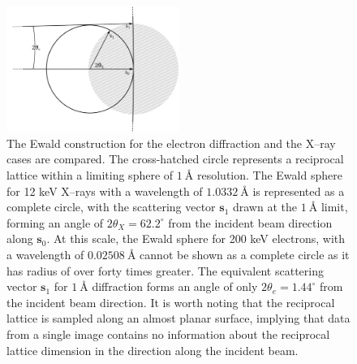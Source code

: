 \documentclass[preprint]{iucr}
\renewcommand{\vec}[1]{\mathbf{#1}}
\begin{document}
\begin{figure}
  \label{fig:ewald}
  \centering
  \caption{
    The Ewald construction for the electron diffraction and the X--ray cases are
    compared. The cross-hatched circle represents a reciprocal lattice within
    a limiting sphere of $\SI{1}{\angstrom}$ resolution. The Ewald
    sphere for 12 keV X--rays with a wavelength of $\SI{1.0332}{\angstrom}$ is
    represented as a complete circle, with the scattering vector $\vec{s}_1$
    drawn at the $\SI{1}{\angstrom}$ limit, forming an angle of
    $2\theta_X=62.2^\circ$ from the incident beam direction along $\vec{s}_0$.
    At this scale, the Ewald sphere for 200 keV electrons, with a wavelength of
    $\SI{0.02508}{\angstrom}$ cannot be shown as a complete circle as it has
    radius of over forty times greater. The equivalent scattering vector
    $\vec{s}_1$ for $\SI{1}{\angstrom}$ diffraction forms an angle of only
    $2\theta_e=1.44^\circ$ from the incident beam direction. It is worth noting
    that the reciprocal lattice is sampled along an almost planar surface,
    implying that data from a single image contains no information about the
    reciprocal lattice dimension in the direction along the incident beam.
  }
  \includegraphics[width=0.5\textwidth]{Figures/geometry/ewald.png}
\end{figure}
\end{document}
